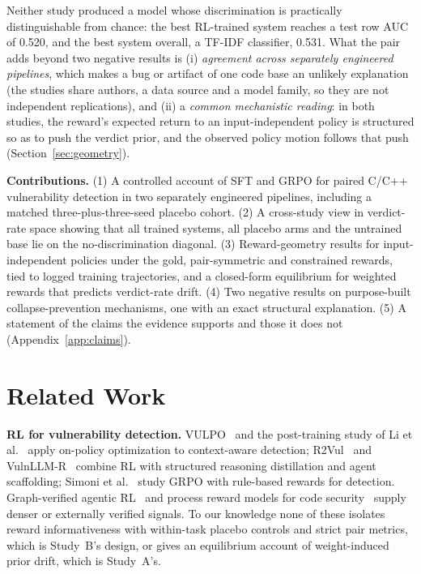 \documentclass[journal]{IEEEtran}
\begin{document}
Neither study produced a model whose discrimination is practically distinguishable from chance: the best RL-trained system reaches a test row AUC of 0.520, and the best system overall, a TF-IDF classifier, 0.531. What the pair adds beyond two negative results is (i) \emph{agreement across separately engineered pipelines}, which makes a bug or artifact of one code base an unlikely explanation (the studies share authors, a data source and a model family, so they are not independent replications), and (ii) a \emph{common mechanistic reading}: in both studies, the reward's expected return to an input-independent policy is structured so as to push the verdict prior, and the observed policy motion follows that push (Section~\ref{sec:geometry}).

\textbf{Contributions.}
(1) A controlled account of SFT and GRPO for paired C/C++ vulnerability detection in two separately engineered pipelines, including a matched three-plus-three-seed placebo cohort.
(2) A cross-study view in verdict-rate space showing that all trained systems, all placebo arms and the untrained base lie on the no-discrimination diagonal.
(3) Reward-geometry results for input-independent policies under the gold, pair-symmetric and constrained rewards, tied to logged training trajectories, and a closed-form equilibrium for weighted rewards that predicts verdict-rate drift.
(4) Two negative results on purpose-built collapse-prevention mechanisms, one with an exact structural explanation.
(5) A statement of the claims the evidence supports and those it does not (Appendix~\ref{app:claims}).

\section{Related Work}
\textbf{RL for vulnerability detection.} VULPO~\cite{vulpo} and the post-training study of Li et al.~\cite{openvul} apply on-policy optimization to context-aware detection; R2Vul~\cite{r2vul} and VulnLLM-R~\cite{vulnllmr} combine RL with structured reasoning distillation and agent scaffolding; Simoni et al.~\cite{simoni} study GRPO with rule-based rewards for detection. Graph-verified agentic RL~\cite{vulagentrl} and process reward models for code security~\cite{seccodeprm} supply denser or externally verified signals. To our knowledge none of these isolates reward informativeness with within-task placebo controls and strict pair metrics, which is Study~B's design, or gives an equilibrium account of weight-induced prior drift, which is Study~A's.
\end{document}
